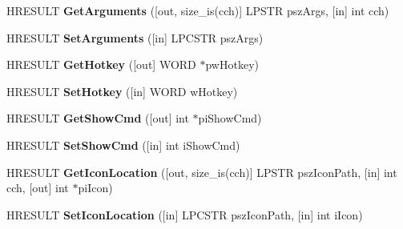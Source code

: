 \begin{DoxyCompactItemize}
\item 
\mbox{\label{interface_i_shell_link_a_afbbb879ce8d25cd63c0d6404a25afa8c}} 
H\+R\+E\+S\+U\+LT {\bfseries Get\+Arguments} (\mbox{[}out, size\+\_\+is(cch)\mbox{]} L\+P\+S\+TR psz\+Args, \mbox{[}in\mbox{]} int cch)
\item 
\mbox{\label{interface_i_shell_link_a_a2c25c88a3b7be4c25281c9c34dd4948d}} 
H\+R\+E\+S\+U\+LT {\bfseries Set\+Arguments} (\mbox{[}in\mbox{]} L\+P\+C\+S\+TR psz\+Args)
\item 
\mbox{\label{interface_i_shell_link_a_ad5fc9007c9d52ad0ad1021125a90f4ab}} 
H\+R\+E\+S\+U\+LT {\bfseries Get\+Hotkey} (\mbox{[}out\mbox{]} W\+O\+RD $\ast$pw\+Hotkey)
\item 
\mbox{\label{interface_i_shell_link_a_afec156d4c608b68f1db0b29a0102d9db}} 
H\+R\+E\+S\+U\+LT {\bfseries Set\+Hotkey} (\mbox{[}in\mbox{]} W\+O\+RD w\+Hotkey)
\item 
\mbox{\label{interface_i_shell_link_a_ac84284ebaeebb15dd7df31d8dfe5d2a2}} 
H\+R\+E\+S\+U\+LT {\bfseries Get\+Show\+Cmd} (\mbox{[}out\mbox{]} int $\ast$pi\+Show\+Cmd)
\item 
\mbox{\label{interface_i_shell_link_a_a6ceb3faa22d8b2619b42254efde754ec}} 
H\+R\+E\+S\+U\+LT {\bfseries Set\+Show\+Cmd} (\mbox{[}in\mbox{]} int i\+Show\+Cmd)
\item 
\mbox{\label{interface_i_shell_link_a_a844c0ef92fd8202b60c886b279c5ca7e}} 
H\+R\+E\+S\+U\+LT {\bfseries Get\+Icon\+Location} (\mbox{[}out, size\+\_\+is(cch)\mbox{]} L\+P\+S\+TR psz\+Icon\+Path, \mbox{[}in\mbox{]} int cch, \mbox{[}out\mbox{]} int $\ast$pi\+Icon)
\item 
\mbox{\label{interface_i_shell_link_a_a662df211550ed613851da76c403ddd65}} 
H\+R\+E\+S\+U\+LT {\bfseries Set\+Icon\+Location} (\mbox{[}in\mbox{]} L\+P\+C\+S\+TR psz\+Icon\+Path, \mbox{[}in\mbox{]} int i\+Icon)
\item 
\mbox{\label{interface_i_shell_link_a_a38be7fa09c11620ad77bfce3375f565f}} 

\end{DoxyCompactItemize}
